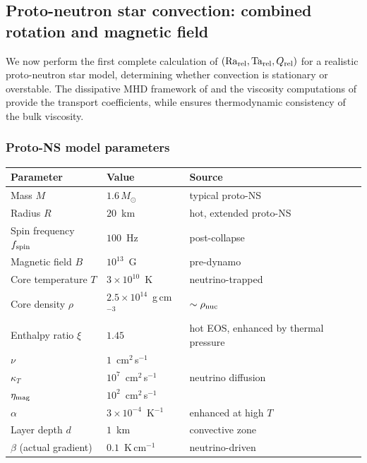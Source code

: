 \subsection*{Proto-neutron star convection: combined rotation and
magnetic field}

We now perform the first complete calculation of
$(\mathrm{Ra}_{\mathrm{rel}}, \mathrm{Ta}_{\mathrm{rel}}, Q_{\mathrm{rel}})$ for a realistic proto-neutron star model,
determining whether convection is stationary or overstable.  The
dissipative MHD framework of \citet{MostNoronha2021} and the
viscosity computations of \citet{CamelioEtAl2023} provide the
transport coefficients, while \citet{Gavassino2024} ensures
thermodynamic consistency of the bulk viscosity.

\subsubsection*{Proto-NS model parameters}

\begin{center}
\begin{tabular}{lll}
\hline
Parameter & Value & Source \\
\hline
Mass $M$ & $1.6\,M_\odot$ & typical proto-NS \\
Radius $R$ & $20$~km & hot, extended proto-NS \\
Spin frequency $f_{\rm spin}$ & $100$~Hz & post-collapse \\
Magnetic field $B$ & $10^{13}$~G & pre-dynamo \\
Core temperature $T$ & $3\times 10^{10}$~K & neutrino-trapped \\
Core density $\rho$ & $2.5\times 10^{14}$~g\,cm$^{-3}$ & $\sim\rho_{\rm nuc}$ \\
Enthalpy ratio $\xi$ & $1.45$ & hot EOS, enhanced by thermal pressure \\
$\nu$ & $1$~cm$^2$\,s$^{-1}$ & \citet{CamelioEtAl2023} \\
$\kappa_T$ & $10^7$~cm$^2$\,s$^{-1}$ & neutrino diffusion \\
$\eta_{\rm mag}$ & $10^2$~cm$^2$\,s$^{-1}$ & \\
$\alpha$ & $3\times 10^{-4}$~K$^{-1}$ & enhanced at high $T$ \\
Layer depth $d$ & $1$~km & convective zone \\
$\beta$ (actual gradient) & $0.1$~K\,cm$^{-1}$ & neutrino-driven \\
\hline
\end{tabular}
\end{center}

